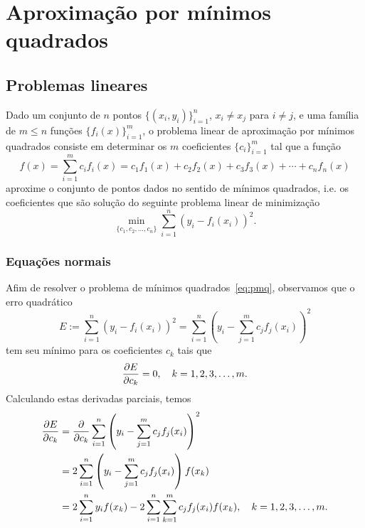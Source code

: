 
\chapter{Aproximação por mínimos quadrados}\label{cap:ajuste}
\thispagestyle{fancy}

\section{Problemas lineares}

Dado um conjunto de $n$ pontos $\{(x_i,y_i)\}_{i=1}^n$, $x_i\neq x_j$ para $i\neq j$, e uma família de $m \leq n$ funções $\{f_i(x)\}_{i=1}^m$, o problema linear de aproximação por mínimos quadrados consiste em determinar os $m$ coeficientes $\{c_i\}_{i=1}^m$ tal que a função
\begin{equation}
  f(x) = \sum_{i=1}^m c_if_i(x) = c_1f_1(x) + c_2f_2(x) + c_3f_3(x) + \cdots + c_nf_n(x)
\end{equation}
aproxime o conjunto de pontos dados no sentido de mínimos quadrados, i.e. os coeficientes que são solução do seguinte problema linear de minimização
\begin{equation}\label{eq:pmq}
  \min_{\{c_1,c_2,\dotsc,c_n\}} \sum_{i=1}^n (y_i - f_i(x_i))^2.
\end{equation}

\subsection{Equações normais}

Afim de resolver o problema de mínimos quadrados~\eqref{eq:pmq}, observamos que o erro quadrático
\begin{equation}
  E := \sum_{i=1}^n (y_i - f_i(x_i))^2 = \sum_{i=1}^n \left(y_i - \sum_{j=1}^m c_jf_j(x_i)\right)^2
\end{equation}
tem seu mínimo para os coeficientes $c_k$ tais que
\begin{equation}\label{eq:aux1_mq}
  \frac{\partial E}{\partial c_k} = 0,\quad k=1, 2, 3, \dotsc, m.
\end{equation}
Calculando estas derivadas parciais, temos
\begin{equation}
  \begin{split}
    \frac{\partial E}{\partial c_k} &= \frac{\partial}{\partial c_k} \sum_{i=1}^n \left(y_i - \sum_{j=1}^m c_jf_j(x_i)\right)^2\\
    &= 2\sum_{i=1}^n \left(y_i - \sum_{j=1}^m c_jf_j(x_i)\right)f(x_k)\\
    &= 2\sum_{i=1}^n y_if(x_k) - 2\sum_{i=1}^n\sum_{k=1}^m c_jf_j(x_i)f(x_k),\quad k=1, 2, 3, \dotsc, m.
  \end{split}
\end{equation}

